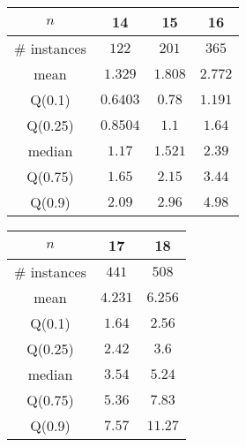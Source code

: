 \begin{tabular}{c|ccc} 
\hline 
$n$ & 14 & 15 & 16 \tabularnewline 
\hline 
\hline 
\# instances & $122$ & $201$ & $365$ \tabularnewline 
mean & $1.329$ & $1.808$ & $2.772$ \tabularnewline 
Q(0.1) & $0.6403$ & $0.78$ & $1.191$ \tabularnewline 
Q(0.25) & $0.8504$ & $1.1$ & $1.64$ \tabularnewline 
median & $1.17$ & $1.521$ & $2.39$ \tabularnewline 
Q(0.75) & $1.65$ & $2.15$ & $3.44$ \tabularnewline 
Q(0.9) & $2.09$ & $2.96$ & $4.98$ \tabularnewline 
\hline 
\end{tabular} 
\medskip{} 

\begin{tabular}{c|cc} 
\hline 
$n$ & 17 & 18 \tabularnewline 
\hline 
\hline 
\# instances & $441$ & $508$ \tabularnewline 
mean & $4.231$ & $6.256$ \tabularnewline 
Q(0.1) & $1.64$ & $2.56$ \tabularnewline 
Q(0.25) & $2.42$ & $3.6$ \tabularnewline 
median & $3.54$ & $5.24$ \tabularnewline 
Q(0.75) & $5.36$ & $7.83$ \tabularnewline 
Q(0.9) & $7.57$ & $11.27$ \tabularnewline 
\hline 
\end{tabular} 
\medskip{} 

